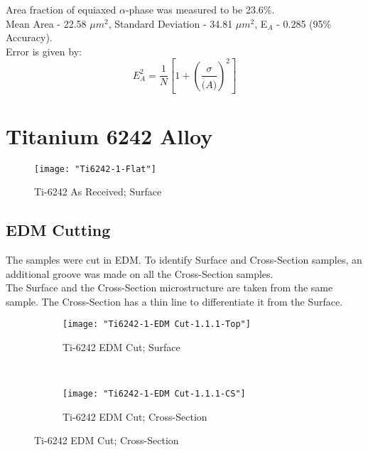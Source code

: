 Area fraction of equiaxed $\alpha$-phase was measured to be 23.6\%.
\\
Mean Area - 22.58 $\mu m^{2}$, Standard Deviation - 34.81 $\mu m^{2}$, E$_{A}$ - 0.285 (95\% Accuracy). 
\\
Error is given by:
\begin{equation}
E_{A}^{2} = \dfrac{1}{N}[1+(\dfrac{\sigma}{\overline(A)})^{2}]
\end{equation}



\newpage
\renewcommand{\workingDate}{\textsc{2017 $|$ August $|$ 22}}

\section{Titanium 6242 Alloy} 

\begin{figure}[H]
    \centering
        \texttt{[image: "Ti6242-1-Flat"]}
        \caption{Ti-6242 As Received; Surface}
    \label{fig:EDM-Cut}
\end{figure}



\subsection{EDM Cutting}
The samples were cut in EDM. To identify Surface and Cross-Section samples, an additional groove was made on all the Cross-Section samples. 
\\
The Surface and the Cross-Section microstructure are taken from the same sample. The Cross-Section has a thin line to differentiate it from the Surface.


\begin{figure}[H]
    \centering
    \begin{subfigure}{0.40\textwidth}
        \texttt{[image: "Ti6242-1-EDM Cut-1.1.1-Top"]}
        \caption{Ti-6242 EDM Cut; Surface}
        \label{fig:2a}
    \end{subfigure}
    ~
    \begin{subfigure}{0.40\textwidth}
        \texttt{[image: "Ti6242-1-EDM Cut-1.1.1-CS"]}
        \caption{Ti-6242 EDM Cut; Cross-Section}
        \label{fig:2b}
    \end{subfigure}
    \label{fig:Ti-6242 EDM Cut; Cross-Section}
\end{figure}


